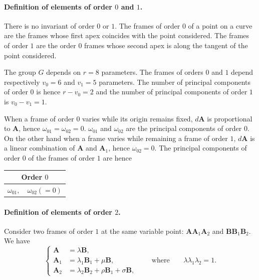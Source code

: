 \documentclass[leqno,11pt]{book}
\numberwithin{equation}{chapter}
\theoremstyle{shape1}
\theoremstyle{shapesmall}
\begin{document}
\paragraph{Definition of elements of order $0$ and $1$.}
\label{sec:142}
There is no invariant of order $0$ or $1$. The frames of order $0$ of a point on a curve are the frames whose first apex coincides with the point considered. The frames of order $1$ are the order $0$ frames whose second apex is along the tangent of the point considered.

The group $G$ depends on $r=8$ parameters. The frames of orders $0$ and $1$ depend respectively $v_{0}=6$ and $v_{1}=5$ parameters. The number of principal components of order $0$ is hence $r-v_{0}=2$ and the number of principal components of order $1$ is $v_{0}-v_{1}=1$.

When a frame of order $0$ varies while its origin remains fixed, $d\mathbf{A}$ is proportional to $\mathbf{A}$, hence $\omega_{01}=\omega_{02}=0$. $\omega_{01}$ and $\omega_{02}$ are the principal components of order $0$. On the other hand when a frame varies while remaining a frame of order $1$, $d\mathbf{A}$ is a linear combination of $\mathbf{A}$ and $\mathbf{A}_{1}$, hence $\omega_{02}=0$. The principal components of order $0$ of the frames of order $1$ are hence
 \begin{center}  
\begin{tabular}{|c|}
  \hline
  Order $0$\\
  \hline
  $\omega_{01},\quad\omega_{02}(=0)$\\
  \hline
\end{tabular}
\end{center}


\paragraph{Definition of elements of order $2$.}
\label{sec:143}
Consider two frames of order $1$ at the same variable point: $\mathbf{AA}_{1}\mathbf{A}_{2}$ and $\mathbf{BB}_{1}\mathbf{B}_{2}$. We have
\begin{equation}
  \label{eq:10.3.4}
  \left\{
    \begin{aligned}
      \mathbf{A}_{\phantom{0}}&=\lambda\mathbf{B},\\
      \mathbf{A}_{{1}}&=\lambda_{1}\mathbf{B}_{1}+\mu\mathbf{B},\\
      \mathbf{A}_{{2}}&=\lambda_{2}\mathbf{B}_{2}+\rho\mathbf{B}_{1}+\sigma\mathbf{B},
    \end{aligned}
  \right.\qquad\text{where}\qquad\lambda\lambda_{1}\lambda_{2}=1.
\end{equation}
\end{document}
